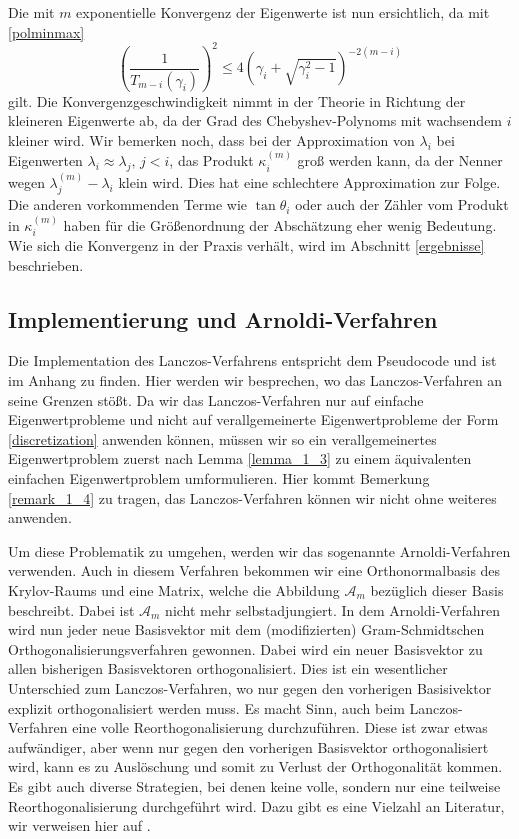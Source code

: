\documentclass{article}
\theoremstyle{plain}
\begin{document}
Die mit $m$ exponentielle Konvergenz der Eigenwerte ist nun ersichtlich, da mit \eqref{polminmax}
\begin{equation*}
	\left(\frac{1}{T_{m-i}(\gamma_i)}\right)^2 \le 4 \left(\gamma_i + \sqrt{\gamma_i^2 -1}\right)^{-2(m-i)}
\end{equation*}
gilt. Die Konvergenzgeschwindigkeit nimmt in der Theorie in Richtung der kleineren Eigenwerte ab, da der Grad des Chebyshev-Polynoms mit wachsendem $i$ kleiner wird. Wir bemerken noch, dass bei der Approximation von $\lambda_i$ bei Eigenwerten $\lambda_i \approx \lambda_j, \, j < i$, das Produkt $\kappa_i^{(m)}$ groß werden kann, da der Nenner wegen $\lambda^{(m)}_j - \lambda_i$ klein wird. Dies hat eine schlechtere Approximation zur Folge. Die anderen vorkommenden Terme wie $\tan \theta_i$ oder auch der Zähler vom Produkt in $\kappa_i^{(m)}$ haben für die Größenordnung der Abschätzung eher wenig Bedeutung. Wie sich die Konvergenz in der Praxis verhält, wird im Abschnitt \ref{ergebnisse} beschrieben.


\subsection{Implementierung und Arnoldi-Verfahren}

Die Implementation des Lanczos-Verfahrens entspricht dem Pseudocode und ist im Anhang zu finden. Hier werden wir besprechen, wo das Lanczos-Verfahren an seine Grenzen stößt. Da wir das Lanczos-Verfahren nur auf einfache Eigenwertprobleme und nicht auf verallgemeinerte Eigenwertprobleme der Form \eqref{discretization} anwenden können, müssen wir so ein verallgemeinertes Eigenwertproblem zuerst nach Lemma \ref{lemma_1_3} zu einem äquivalenten einfachen Eigenwertproblem umformulieren. Hier kommt Bemerkung \ref{remark_1_4} zu tragen, das Lanczos-Verfahren können wir nicht ohne weiteres anwenden.

Um diese Problematik zu umgehen, werden wir das sogenannte Arnoldi-Verfahren verwenden. Auch in diesem Verfahren bekommen wir eine Orthonormalbasis des Krylov-Raums und eine Matrix, welche die Abbildung $\mathcal{A}_m$ bezüglich dieser Basis beschreibt. Dabei ist $\mathcal{A}_m$ nicht mehr selbstadjungiert. In dem Arnoldi-Verfahren wird nun jeder neue Basisvektor mit dem (modifizierten) Gram-Schmidtschen Orthogonalisierungsverfahren gewonnen. Dabei wird ein neuer Basisvektor zu allen bisherigen Basisvektoren orthogonalisiert. Dies ist ein wesentlicher Unterschied zum Lanczos-Verfahren, wo nur gegen den vorherigen Basisivektor explizit orthogonalisiert werden muss.
Es macht Sinn, auch beim Lanczos-Verfahren eine volle Reorthogonalisierung durchzuführen. Diese ist zwar etwas aufwändiger, aber wenn nur gegen den vorherigen Basisvektor orthogonalisiert wird, kann es zu Auslöschung und somit zu Verlust der Orthogonalität kommen. Es gibt auch diverse Strategien, bei denen keine volle, sondern nur eine teilweise Reorthogonalisierung durchgeführt wird. Dazu gibt es eine Vielzahl an Literatur, wir verweisen hier auf \cite{reorthogonalization}.
\end{document}
